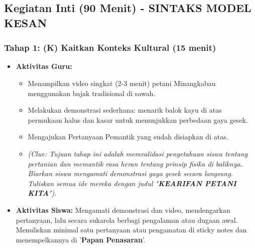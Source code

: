 \documentclass[12pt,a4paper]{article}
\begin{document}
\subsection{Kegiatan Inti (90 Menit) - SINTAKS MODEL KESAN}

\subsubsection{Tahap 1: (K) Kaitkan Konteks Kultural (15 menit)}
\begin{itemize}
\item \textbf{Aktivitas Guru:}
    \begin{itemize}
    \item Menampilkan video singkat (2-3 menit) petani Minangkabau menggunakan bajak tradisional di sawah.
    \item Melakukan demonstrasi sederhana: menarik balok kayu di atas permukaan halus dan kasar untuk menunjukkan perbedaan gaya gesek.
    \item Mengajukan Pertanyaan Pemantik yang sudah disiapkan di atas.
    \item \textit{(Clue: Tujuan tahap ini adalah memvalidasi pengetahuan siswa tentang pertanian dan memantik rasa heran tentang prinsip fisika di baliknya. Biarkan siswa mengamati demonstrasi gaya gesek secara langsung. Tuliskan semua ide mereka dengan judul "\textbf{KEARIFAN PETANI KITA}").}
    \end{itemize}
\item \textbf{Aktivitas Siswa:} Mengamati demonstrasi dan video, mendengarkan pertanyaan, lalu secara sukarela berbagi pengalaman atau dugaan awal. Menuliskan minimal satu pertanyaan atau pengamatan di sticky notes dan menempelkannya di '\textbf{Papan Penasaran}'.
\end{itemize}
\end{document}
